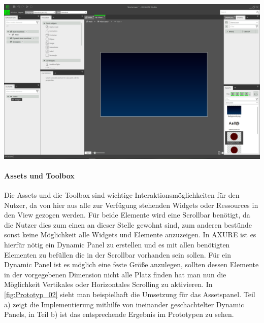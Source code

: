 \begin{center}
  \includegraphics[scale=0.4]{figures/Prototyp_01.PNG}
  \label{fig:Prototyp_01}
\end{center}

\paragraph{Assets und Toolbox}
Die Assets und die Toolbox sind wichtige Interaktionsmöglichkeiten für den Nutzer, da von hier aus alle zur Verfügung stehenden Widgets oder Ressources in den View gezogen werden.
Für beide Elemente wird eine Scrollbar benötigt, da die Nutzer dies zum einen  an dieser Stelle gewohnt sind, zum anderen bestünde sonst keine Möglichkeit alle Widgets und Elemente anzuzeigen.
In AXURE ist es hierfür nötig ein Dynamic Panel zu erstellen und es mit allen benötigten Elementen zu befüllen die in der Scrollbar vorhanden sein sollen.
Für ein Dynamic Panel ist es möglich eine feste Größe anzulegen, sollten dessen Elemente in der vorgegebenen Dimension nicht alle Platz finden hat man nun die Möglichkeit Vertikales oder Horizontales Scrolling zu aktivieren.
In \cref{fig:Prototyp_02} sieht man beispielhaft die Umsetzung für das Assetspanel.
Teil a) zeigt die Implementierung mithilfe von ineinander geschachtelter Dynamic Panels, in Teil b) ist das entsprechende Ergebnis im Prototypen zu sehen.

